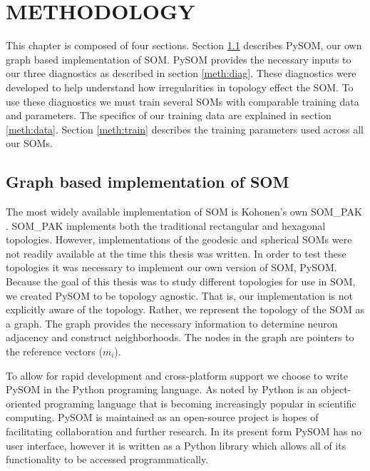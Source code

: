\chapter{METHODOLOGY}
This chapter is composed of four sections.
Section \ref{meth:som} describes PySOM, our own graph based implementation of
SOM. PySOM provides the necessary inputs to our three diagnostics as described
in section \ref{meth:diag}.  These diagnostics were developed to help
understand how irregularities in topology effect the SOM. To use these
diagnostics we must train several SOMs with comparable training data and
parameters.  The specifics of our training data are explained in section
\ref{meth:data}.  Section \ref{meth:train} describes the training parameters used
across all our SOMs.

\section{Graph based implementation of SOM}
\label{meth:som}
The most widely available implementation of SOM is Kohonen's
own SOM\_PAK \citep{kohonen1996}.  SOM\_PAK implements both the traditional
rectangular and hexagonal topologies.  However, implementations of the
geodesic and spherical SOMs were not readily available at the time this thesis
was written.  In order to test these topologies it was necessary to implement
our own version of SOM, PySOM.  Because the goal of this thesis was to study
different topologies for use in SOM, we created PySOM to be topology agnostic.
That is, our implementation is not explicitly aware of the topology.  Rather, we
represent the topology of the SOM as a graph. The graph provides the necessary
information to determine neuron adjacency and construct neighborhoods.  The
nodes in the graph are pointers to the reference vectors ($m_i$).

To allow for rapid development and cross-platform support we choose to write PySOM
in the Python programing language. As noted by \cite{Rey2006} Python is an
object-oriented programing language that is becoming increasingly popular in
scientific computing. PySOM is maintained as an open-source project is hopes
of facilitating collaboration and further research.  In its present form
PySOM has no user interface, however it is written as a Python library which
allows all of its functionality to be accessed programmatically. %

